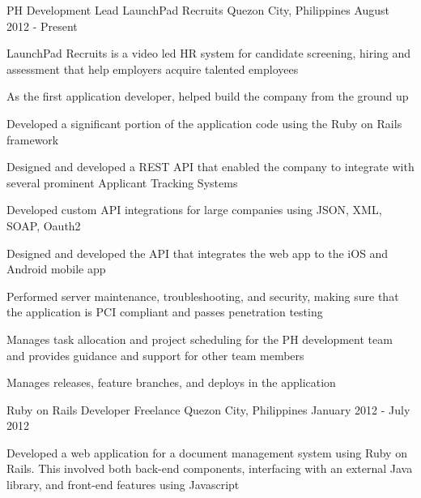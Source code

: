 

\begin{cventries}

  \cventry
    {PH Development Lead} %
    {LaunchPad Recruits} %
    {Quezon City, Philippines} %
    {August 2012 - Present} %
    {
      \begin{cvitems} %
        \item {LaunchPad Recruits is a video led HR system for candidate screening, hiring and assessment that help employers acquire talented employees}
        \item {As the first application developer, helped build the company from the ground up}
        \item {Developed a significant portion of the application code using the Ruby on Rails framework}
        \item {Designed and developed a REST API that enabled the company to integrate with several prominent Applicant Tracking Systems}
        \item {Developed custom API integrations for large companies using JSON, XML, SOAP, Oauth2}
        \item {Designed and developed the API that integrates the web app to the iOS and Android mobile app}
        \item {Performed server maintenance, troubleshooting, and security, making sure that the application is PCI compliant and passes penetration testing}
        \item {Manages task allocation and project scheduling for the PH development team and provides guidance and support for other team members}
        \item {Manages releases, feature branches, and deploys in the application}
      \end{cvitems}
    }

  \cventry
    {Ruby on Rails Developer} %
    {Freelance} %
    {Quezon City, Philippines} %
    {January 2012 - July 2012} %
    {
      \begin{cvitems} %
        \item {Developed a web application for a document management system using Ruby on Rails. This involved both back-end components, interfacing with an external Java library, and front-end features using Javascript}
      \end{cvitems}
    }


\end{cventries}
